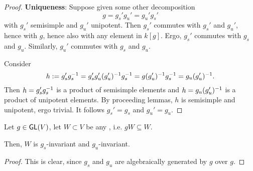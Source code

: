 \begin{proof}
\textbf{Uniqueness}: Suppose given some other decomposition
\[ g = g_s'g_u' = g_u'g_s' \]
with $g_s'$ semisimple and $g_u'$ unipotent. Then $g_s'$ commutes with $g_s'$ and $g_u'$, hence with $g$, hence also with any element in $k[g]$.
Ergo, $g_s'$ commutes with $g_s$ and $g_u$. Similarly, $g_u'$ commutes with $g_s$ and $g_u$.

Consider 
\[ h := g_s' g_s^{-1} = g_s' g_u' (g_u')^{-1} g_s^{-1} = g (g_u')^{-1} g_s^{-1} = g_u (g_u')^{-1}. \]
Then $h = g_s' g_s^{-1}$ is a product of semisimple elements and $h = g_u (g_u')^{-1}$ is a product of unipotent elements. By proceeding lemmas, $h$ is semisimple and unipotent, ergo trivial. It follows $g_s' = g_s$ and $g_u' = g_u$.
\end{proof}

\begin{corollary}
Let $g \in \textsf{GL}(V)$, let $W \subset V$ be any , i.e. $gW \subseteq W$.

Then, $W$ is $g_s$-invariant and $g_u$-invariant.
\end{corollary}
\begin{proof}
This is clear, since $g_s$ and $g_u$ are algebraically generated by $g$ over $g$.
\end{proof}

